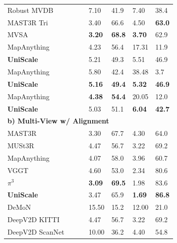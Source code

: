 \documentclass[letterpaper, 10 pt, conference]{ieeeconf}  %
\newcommand{\cmark}{\ding{51}}
\newcommand{\xmark}{\ding{55}}
\begin{document}
\begin{table} [t]
\begin{tabular}{p{2.4cm}p{0.3cm}p{0.3cm}p{0.5cm}p{0.5cm}p{0.5cm}p{0.5cm}}
\hline
Robust MVDB~\cite{schroppel2022benchmark} & \cmark & \cmark &  7.10 & 41.9 & 7.40 & 38.4 \\
MAST3R Tri~\cite{izquierdo2025mvsanywhere} & \cmark & \cmark &  3.40 & 66.6 & 4.50 & \textbf{63.0} \\
MVSA~\cite{izquierdo2025mvsanywhere} & \cmark & \cmark &  \textbf{3.20} & \textbf{68.8} & \textbf{3.70} & 62.9 \\
MapAnything~\cite{keetha2025mapanything} & \cmark & \cmark &  4.23 & 56.4 & 17.31 & 11.9 \\
\textbf{UniScale} & \cmark & \cmark & 5.21 & 49.3 & 5.51 &  46.9\\
\hline
MapAnything~\cite{keetha2025mapanything} & \cmark & \xmark & 5.80 & 42.4 & 38.48 &  3.7 \\
\textbf{UniScale} & \cmark & \xmark & \textbf{5.16} & \textbf{49.4} & \textbf{5.32} & \textbf{46.9} \\
\hline
MapAnything~\cite{keetha2025mapanything} & \xmark & \cmark & \textbf{4.38} & \textbf{54.4} & 20.05   & 12.0 \\
\textbf{UniScale} & \xmark & \cmark & 5.03 & 51.1 & \textbf{6.04} &  \textbf{42.7}\\
\hline
\multicolumn{7}{l}{\textbf{b) Multi-View w/ Alignment}} \\
MAST3R~\cite{leroy2024grounding}  & \xmark & \xmark &  3.30 & 67.7 & 4.30 & 64.0 \\
MUSt3R~\cite{cabon2025must3r}  & \xmark & \xmark &  4.47 & 56.7 & 3.22 & 69.2 \\
MapAnything~\cite{keetha2025mapanything}  & \xmark & \xmark &  4.07 & 58.0 & 3.96 & 60.7 \\
VGGT~\cite{wang2025vggt}  & \xmark & \xmark &  4.60 & 53.0 & 2.34 & 80.6 \\
$\pi^3$~\cite{keetha2025mapanything}  & \xmark & \xmark &  \textbf{3.09} & \textbf{69.5} & 1.98 & 83.6 \\
\textbf{UniScale} & \xmark & \xmark & 3.47 & 65.9 & \textbf{1.69} & \textbf{86.8} \\
\hline
DeMoN~\cite{ummenhofer2017demon}  & \cmark & \xmark & 15.50 & 15.2 & 12.00 & 21.0 \\
DeepV2D KITTI~\cite{teed2018deepv2d}  & \cmark & \xmark &  4.47 & 56.7 & 3.22 & 69.2 \\
DeepV2D ScanNet~\cite{teed2018deepv2d}  & \cmark & \xmark &  10.00 & 36.2 & 4.40 & 54.8 \\

\end{tabular}
\end{table}
\end{document}
